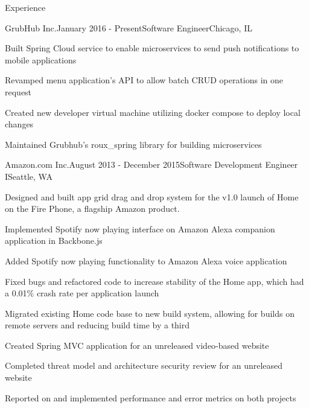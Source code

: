 \documentclass{resume} %
\begin{document}



\begin{rSection}{Experience}


\begin{rSubsection}{GrubHub Inc.}{January 2016 - Present}{Software Engineer}{Chicago, IL}
\item Built Spring Cloud service to enable microservices to send push notifications to mobile applications
\item Revamped menu application's API to allow batch CRUD operations in one request
\item Created new developer virtual machine utilizing docker compose to deploy local changes
\item Maintained Grubhub's roux\_spring library for building microservices
\end{rSubsection} 


\begin{rSubsection}{Amazon.com Inc.}{August 2013 - December 2015}{Software Development Engineer I}{Seattle, WA}
\item Designed and built app grid drag and drop system for the v1.0 launch of Home on the Fire Phone, a flagship Amazon product.
\item Implemented Spotify now playing interface on Amazon Alexa companion application in Backbone.js
\item Added Spotify now playing functionality to Amazon Alexa voice application
\item Fixed bugs and refactored code to increase stability of the Home app, which had a 0.01\% crash rate per application launch
\item Migrated existing Home code base to new build system, allowing for builds on remote servers and reducing build time by a third
\item Created Spring MVC application for an unreleased video-based website
\item Completed threat model and architecture security review for an unreleased website
\item Reported on and implemented performance and error metrics on both projects
\end{rSubsection}


\end{rSection}
\end{document}
